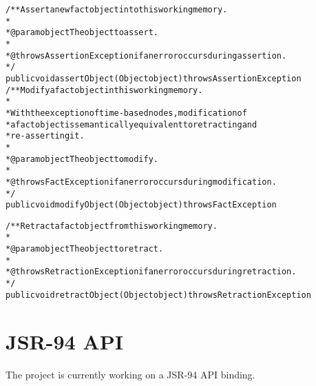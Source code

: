 \bigskip

\footnotesize
\begin{alltt}
/** Assert a new fact object into this working memory.
*
*  @param object The object to assert.
*
*  @throws AssertionException if an error occurs during assertion.
*/
public void assertObject(Object object) throws AssertionException
\newpage
/** Modify a fact object in this working memory.
*
*  With the exception of time-based nodes, modification of
*  a fact object is semantically equivalent to retracting and
*  re-asserting it.
*
*  @param object The object to modify.
*
*  @throws FactException if an error occurs during modification.
*/
public void modifyObject(Object object) throws FactException

/** Retract a fact object from this working memory.
*
*  @param object The object to retract.
*
*  @throws RetractionException if an error occurs during retraction.
*/
public void retractObject(Object object) throws RetractionException
\end{alltt}
\normalsize

\section{JSR-94 API}

The \drools{} project is currently working on a JSR-94 API binding.


